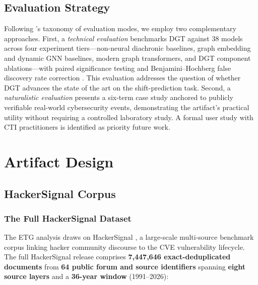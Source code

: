 \documentclass[12pt]{article}
\begin{document}
\subsection{Evaluation Strategy}

Following \textcite{hevner2004}'s taxonomy of evaluation modes, we employ two complementary approaches. First, a \textit{technical evaluation} benchmarks DGT against 38 models across four experiment tiers---non-neural diachronic baselines, graph embedding and dynamic GNN baselines, modern graph transformers, and DGT component ablations---with paired significance testing and Benjamini--Hochberg false discovery rate correction \parencite{benjamini1995}. This evaluation addresses the question of whether DGT advances the state of the art on the shift-prediction task. Second, a \textit{naturalistic evaluation} presents a six-term case study anchored to publicly verifiable real-world cybersecurity events, demonstrating the artifact's practical utility without requiring a controlled laboratory study. A formal user study with CTI practitioners is identified as priority future work.

\section{Artifact Design}
\bodyfont

\subsection{HackerSignal Corpus}

\subsubsection{The Full HackerSignal Dataset}

The ETG analysis draws on HackerSignal \parencite{ampel2026hackersignal}, a large-scale multi-source benchmark corpus linking hacker community discourse to the CVE vulnerability lifecycle. The full HackerSignal release comprises \textbf{7,447,646 exact-deduplicated documents} from \textbf{64 public forum and source identifiers} spanning \textbf{eight source layers} and a \textbf{36-year window} (1991--2026):
\end{document}
